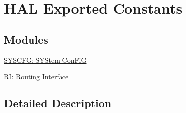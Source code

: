 \hypertarget{group___h_a_l___exported___constants}{\section{H\-A\-L Exported Constants}
\label{group___h_a_l___exported___constants}
}
\subsection*{Modules}
\begin{DoxyCompactItemize}
\item 
\hyperlink{group___s_y_s_c_f_g___constants}{S\-Y\-S\-C\-F\-G\-: S\-Y\-Stem Con\-Fi\-G}
\item 
\hyperlink{group___r_i___constants}{R\-I\-: Routing Interface}
\end{DoxyCompactItemize}


\subsection{Detailed Description}

